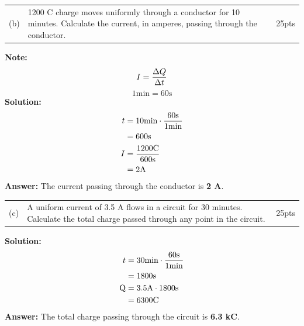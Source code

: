 \documentclass{article}
\newcommand{\problemstatement}[3]{
\noindent
\begin{tabular}{ m{0.5cm} m{42em} m{0.5cm} }
	({#1}) & {#2} & {#3}pts
\end{tabular}
}
\begin{document}
\newpage
\problemstatement{b}{1200 C charge moves uniformly through a conductor for 10 minutes. Calculate the current, in amperes, passing through the conductor.}{25}
\begin{addmargin}[1.5cm]{0em}
	\noindent
	\textbf{Note:} \\
	\begin{equation}
		I = {\Delta Q \over \Delta t}
	\end{equation}
	\begin{equation}
		1 \text{min} = 60 \text{s}
	\end{equation}
	\noindent
	\textbf{Solution:} \\
	\begin{align*}
		t &= 10 \text{min} \cdot {60 \text{s} \over 1 \text{min}} \\
		&= 600 \text{s} \\
		I &= {1200 \text{C} \over 600 \text{s}} \\
		&= 2 \text{A}
	\end{align*}
	\noindent
	\textbf{Answer:} The current passing through the conductor is \textbf{2 A}.
\end{addmargin}

\newpage
\problemstatement{c}{A uniform current of 3.5 A flows in a circuit for 30 minutes. Calculate the total charge passed through any point in the circuit.}{25}
\begin{addmargin}[1.5cm]{0em}
	\noindent
	\textbf{Solution:} \\
	\begin{align*}
		t &= 30 \text{min} \cdot {60 \text{s} \over 1 \text{min}} \\
		&= 1800 \text{s} \\
		\text{Q} &= 3.5 \text{A} \cdot 1800 \text{s} \\
		&= 6300 \text{C}
	\end{align*}
	\noindent
	\textbf{Answer:} The total charge passing through the circuit is \textbf{6.3 kC}.
\end{addmargin}

\newpage
\end{document}
